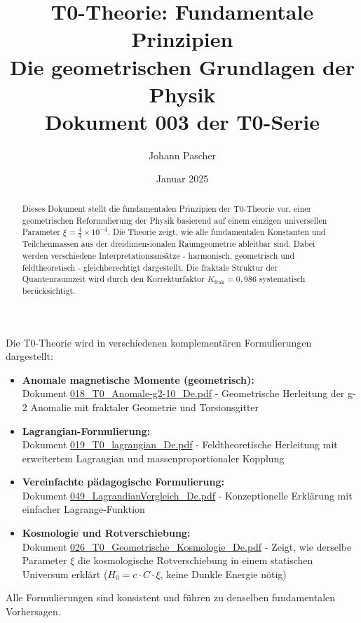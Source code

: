 \documentclass[12pt,a4paper]{article}
\title{\textbf{T0-Theorie: Fundamentale Prinzipien}\\[0.5cm]
	\large Die geometrischen Grundlagen der Physik\\[0.3cm]
	\normalsize Dokument 003 der T0-Serie}
\author{Johann Pascher}
\date{Januar 2025}
\begin{document}
	
	\maketitle
	
	\begin{abstract}
		Dieses Dokument stellt die fundamentalen Prinzipien der T0-Theorie vor, einer geometrischen Reformulierung der Physik basierend auf einem einzigen universellen Parameter $\xi = \frac{4}{3} \times 10^{-4}$. Die Theorie zeigt, wie alle fundamentalen Konstanten und Teilchenmassen aus der dreidimensionalen Raumgeometrie ableitbar sind. Dabei werden verschiedene Interpretationsansätze - harmonisch, geometrisch und feldtheoretisch - gleichberechtigt dargestellt. Die fraktale Struktur der Quantenraumzeit wird durch den Korrekturfaktor $K_{\text{frak}} = 0{,}986$ systematisch berücksichtigt.
	\end{abstract}
	
	\begin{tcolorbox}[colback=blue!10!white, colframe=blue!75!black, title=Verweise auf komplementäre T0-Formulierungen]
		Die T0-Theorie wird in verschiedenen komplementären Formulierungen dargestellt:
		
		\begin{itemize}
			\item \textbf{Anomale magnetische Momente (geometrisch):} \\
			Dokument \href{https://github.com/jpascher/T0-Time-Mass-Duality/blob/main/2/pdf/018_T0_Anomale-g2-10_De.pdf}{018\_T0\_Anomale-g2-10\_De.pdf} - 
			Geometrische Herleitung der g-2 Anomalie mit fraktaler Geometrie und Torsionsgitter
			
			\item \textbf{Lagrangian-Formulierung:} \\
			Dokument \href{https://github.com/jpascher/T0-Time-Mass-Duality/blob/main/2/pdf/019_T0_lagrangian_De.pdf}{019\_T0\_lagrangian\_De.pdf} - 
			Feldtheoretische Herleitung mit erweitertem Lagrangian und massenproportionaler Kopplung
			
			\item \textbf{Vereinfachte pädagogische Formulierung:} \\
			Dokument \href{https://github.com/jpascher/T0-Time-Mass-Duality/blob/main/2/pdf/049_LagrandianVergleich_De.pdf}{049\_LagrandianVergleich\_De.pdf} - 
			Konzeptionelle Erklärung mit einfacher Lagrange-Funktion
			
			\item \textbf{Kosmologie und Rotverschiebung:} \\
			Dokument \href{https://github.com/jpascher/T0-Time-Mass-Duality/blob/main/2/pdf/026_T0_Geometrische_Kosmologie_De.pdf}{026\_T0\_Geometrische\_Kosmologie\_De.pdf} - 
			Zeigt, wie derselbe Parameter $\xi$ die kosmologische Rotverschiebung in einem statischen Universum erklärt ($H_0 = c \cdot C \cdot \xi$, keine Dunkle Energie nötig)
		\end{itemize}
		
		Alle Formulierungen sind konsistent und führen zu denselben fundamentalen Vorhersagen.
	\end{tcolorbox}
	
\end{document}
